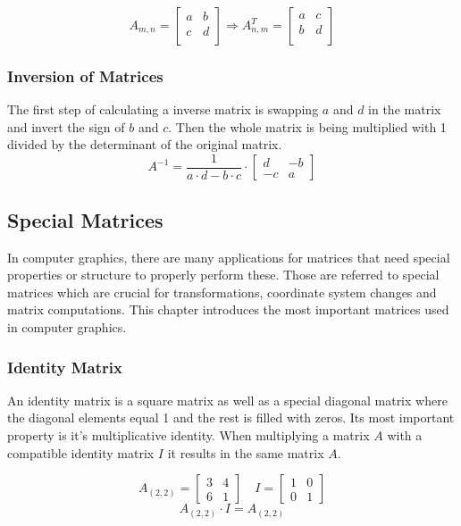 \[
A_{m,n}=
\begin{bmatrix}
a & b \\
c & d \\
\end{bmatrix}
\Longrightarrow 
A^T_{n,m}=
\begin{bmatrix}
a & c \\
b & d \\
\end{bmatrix}
\]

\subsubsection{Inversion of Matrices}
The first step of calculating a inverse matrix is swapping $a$ and $d$ in the matrix and invert the sign of $b$ and $c$. Then the whole matrix is being multiplied with 1 divided by the determinant of the original matrix.\ \cite{Web:19}
\[
A^{-1} = \frac{1}{a \cdot d - b \cdot c} \cdot
\begin{bmatrix}
d & -b \\
-c & a 
\end{bmatrix}
\]


\subsection{Special Matrices}
In computer graphics, there are many applications for matrices that need special properties or structure to properly perform these. Those are referred to special matrices which are crucial for transformations, coordinate system changes and matrix computations. This chapter introduces the most important matrices used in computer graphics.

\subsubsection{Identity Matrix}
An identity matrix is a square matrix as well as a special diagonal matrix where the diagonal elements equal 1 and the rest is filled with zeros. Its most important property is it's multiplicative identity. When multiplying a matrix $A$ with a compatible identity matrix $I$ it results in the same matrix $A$.\ \cite{Web:20}

\[
A_{(2,2)} = 
\begin{bmatrix}
3 & 4 \\
6 & 1
\end{bmatrix} \quad
I = \begin{bmatrix}
1 & 0 \\
0 & 1
\end{bmatrix}
\]
\[
A_{(2,2)} \cdot I = A_{(2,2)}
\]


